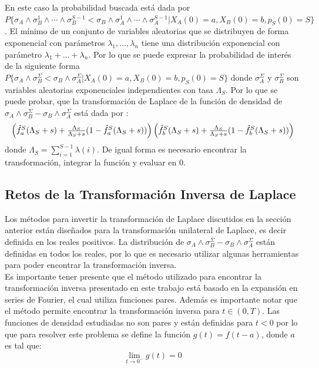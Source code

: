 \documentclass[11pt]{article}
\numberwithin{equation}{section} %
\begin{document}
En este caso la probabilidad buscada está dada por $P\{\sigma_A \land \sigma_B^1 \land \cdots \land \sigma_B^{S-1} < \sigma_B \land \sigma_A^1 \land \cdots \land \sigma_A^{S-1}|X_A(0)=a,X_B(0)=b,p_S(0)=S\}$. El mínimo de un conjunto de variables aleatorias que se distribuyen de forma exponencial con parámetros $\lambda_1,\ldots,\lambda_n$ tiene una distribución exponencial con parámetro $\lambda_1+\ldots+\lambda_n$. Por lo que se puede expresar la probabilidad de interés de la siguiente forma $P\{\sigma_A \land \sigma_B^\Sigma < \sigma_B \land \sigma_A^\Sigma|X_A(0)=a,X_B(0)=b,p_S(0)=S\}$ donde $\sigma_A^\Sigma$ y $\sigma_B^\Sigma$ son
variables aleatorias exponenciales independientes con tasa $\Lambda_S$. Por lo que se puede probar, que la transformación de Laplace de la función de densidad de $\sigma_A \land \sigma_B^\Sigma - \sigma_B \land \sigma_A^\Sigma$ está dada por \cite{Cont2010}:
\[
\resizebox{\hsize}{!}{$
\left(\hat{f}_a^S(\Lambda_S+s)+\frac{\Lambda_S}{\Lambda_S+s}(1-\hat{f}_a^S(\Lambda_S+s))\right)
\left(\hat{f}_b^S(\Lambda_S+s)+\frac{\Lambda_S}{\Lambda_S+s}(1-\hat{f}_b^S(\Lambda_S+s))\right)
$}
\]
donde $\Lambda_S=\sum_{i=1}^{S-1}\lambda(i)$. De igual forma es necesario encontrar la transformación, integrar la función y evaluar en 0.\\

\subsection{Retos de la Transformación Inversa de Laplace}
\label{sec:retos}

Los métodos para invertir la transformación de Laplace discutidos en la sección anterior están diseñados para la transformación unilateral de Laplace, es decir definida en los reales positivos. La distribución de  $\sigma_A \land \sigma_B^\Sigma - \sigma_B \land \sigma_A^\Sigma$ están definidas en todos los reales, por lo que es necesario utilizar algunas herramientas para poder encontrar la transformación inversa.\\

Es importante tener presente que el método utilizado para encontrar la transformación inversa presentado en este trabajo está basado en la expansión en series de Fourier, el cual utiliza funciones pares. Además es importante notar que el método permite encontrar la transformación inversa para $t \in (0,T)$. Las funciones de densidad estudiadas no son pares y están definidas para $t<0$ por lo que para resolver este problema se define la función $g(t)=
f(t-a)$, donde $a$ es tal que:
\[
\lim_{t\to 0^-} g(t)=0
\]
\end{document}
